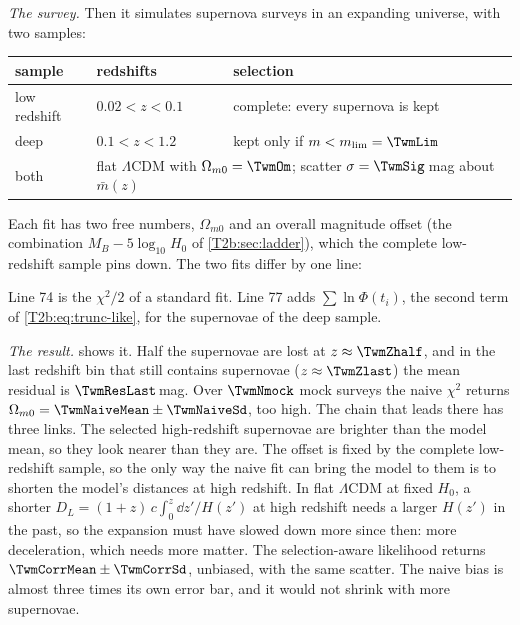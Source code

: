 \emph{The survey.} Then it simulates supernova surveys in an expanding universe, with two samples:
\begin{center}
\small
\begin{tabular}{@{}lll@{}}
\toprule
sample & redshifts & selection\\
\midrule
low redshift & $0.02<z<0.1$ & complete: every supernova is kept\\
deep & $0.1<z<1.2$ & kept only if $m<m_{\rm lim}=\TwmLim$\\
\midrule
both & \multicolumn{2}{l}{flat $\Lambda$CDM with $\Omega_{m0}=\TwmOm$; scatter $\sigma=\TwmSig$\,mag about $\bar m(z)$}\\
\bottomrule
\end{tabular}
\end{center}
Each fit has two free numbers, $\Omega_{m0}$ and an overall magnitude offset (the combination $M_B-5\log_{10}H_0$ of \cref{T2b:sec:ladder}), which the complete low-redshift sample pins down. The two fits differ by one line:


\noindent Line 74 is the $\chi^2/2$ of a standard fit. Line 77 adds $\sum\ln\Phi(t_i)$, the second term of \eqref{T2b:eq:trunc-like}, for the supernovae of the deep sample.

\emph{The result.}  shows it. Half the supernovae are lost at $z\approx\TwmZhalf$, and in the last redshift bin that still contains supernovae ($z\approx\TwmZlast$) the mean residual is $\TwmResLast$\,mag. Over $\TwmNmock$ mock surveys the naive $\chi^2$ returns $\Omega_{m0}=\TwmNaiveMean\pm\TwmNaiveSd$, too high. The chain that leads there has three links. The selected high-redshift supernovae are brighter than the model mean, so they look nearer than they are. The offset is fixed by the complete low-redshift sample, so the only way the naive fit can bring the model to them is to shorten the model's distances at high redshift. In flat $\Lambda$CDM at fixed $H_0$, a shorter $D_L=(1+z)\,c\int_0^z\dd z'/H(z')$ at high redshift needs a larger $H(z')$ in the past, so the expansion must have slowed down more since then: more deceleration, which needs more matter. The selection-aware likelihood returns $\TwmCorrMean\pm\TwmCorrSd$, unbiased, with the same scatter. The naive bias is almost three times its own error bar, and it would not shrink with more supernovae.

